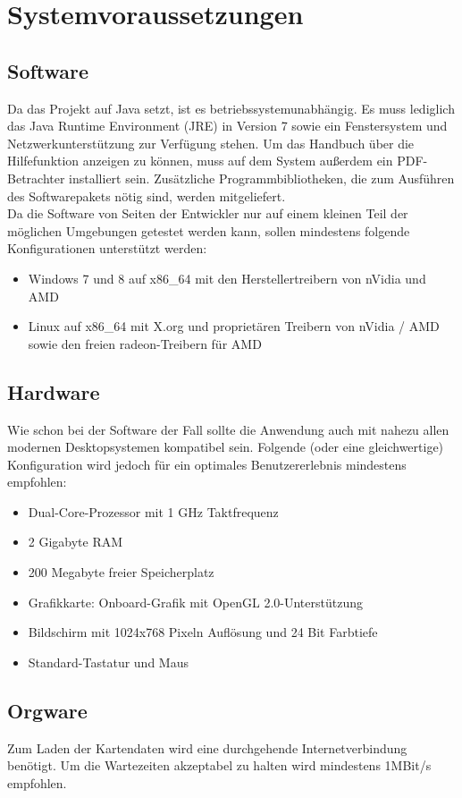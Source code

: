 \documentclass[10pt]{scrreprt}
\begin{document}
\chapter{Systemvoraussetzungen}
\section{Software}
Da das Projekt auf Java setzt, ist es betriebssystemunabhängig. Es muss lediglich das Java Runtime Environment (JRE) in Version 7 sowie ein Fenstersystem und Netzwerkunterstützung zur Verfügung stehen. Um das Handbuch über die Hilfefunktion anzeigen zu können, muss auf dem System außerdem ein PDF-Betrachter installiert sein. Zusätzliche Programmbibliotheken, die zum Ausführen des Softwarepakets nötig sind, werden mitgeliefert.\\

Da die Software von Seiten der Entwickler nur auf einem kleinen Teil der möglichen Umgebungen getestet werden kann, sollen mindestens folgende Konfigurationen unterstützt werden:
\begin{itemize}
\item Windows 7 und 8 auf x86{\_}64 mit den Herstellertreibern von nVidia und AMD
\item Linux auf x86{\_}64 mit X.org und proprietären Treibern von nVidia / AMD sowie den freien radeon-Treibern für AMD
\end{itemize}


\section{Hardware}
Wie schon bei der Software der Fall sollte die Anwendung auch mit nahezu allen modernen Desktopsystemen kompatibel sein. Folgende (oder eine gleichwertige) Konfiguration wird jedoch für ein optimales Benutzererlebnis mindestens empfohlen:
\begin{itemize}
\item Dual-Core-Prozessor mit 1 GHz Taktfrequenz
\item 2 Gigabyte RAM
\item 200 Megabyte freier Speicherplatz
\item Grafikkarte: Onboard-Grafik mit OpenGL 2.0-Unterstützung
\item Bildschirm mit 1024x768 Pixeln Auflösung und 24 Bit Farbtiefe
\item Standard-Tastatur und Maus
\end{itemize}

\section{Orgware}
Zum Laden der Kartendaten wird eine durchgehende Internetverbindung benötigt. Um die Wartezeiten akzeptabel zu halten wird mindestens 1MBit/s empfohlen.
\end{document}

